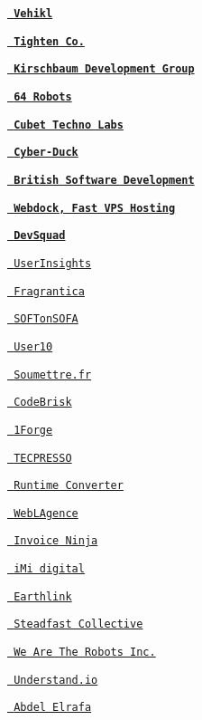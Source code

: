 \begin{DoxyItemize}
\item {\bfseries{\href{https://vehikl.com/}{\texttt{ Vehikl}}}}
\item {\bfseries{\href{https://tighten.co}{\texttt{ Tighten Co.}}}}
\item {\bfseries{\href{https://kirschbaumdevelopment.com}{\texttt{ Kirschbaum Development Group}}}}
\item {\bfseries{\href{https://64robots.com}{\texttt{ 64 Robots}}}}
\item {\bfseries{\href{https://cubettech.com}{\texttt{ Cubet Techno Labs}}}}
\item {\bfseries{\href{https://cyber-duck.co.uk}{\texttt{ Cyber-\/\+Duck}}}}
\item {\bfseries{\href{https://www.britishsoftware.co}{\texttt{ British Software Development}}}}
\item {\bfseries{\href{https://www.webdock.io/en}{\texttt{ Webdock, Fast V\+PS Hosting}}}}
\item {\bfseries{\href{https://devsquad.com}{\texttt{ Dev\+Squad}}}}
\item \href{https://userinsights.com}{\texttt{ User\+Insights}}
\item \href{https://www.fragrantica.com}{\texttt{ Fragrantica}}
\item \href{https://softonsofa.com/}{\texttt{ S\+O\+F\+Ton\+S\+O\+FA}}
\item \href{https://user10.com}{\texttt{ User10}}
\item \href{https://soumettre.fr/}{\texttt{ Soumettre.\+fr}}
\item \href{https://codebrisk.com}{\texttt{ Code\+Brisk}}
\item \href{https://1forge.com}{\texttt{ 1Forge}}
\item \href{https://tecpresso.co.jp/}{\texttt{ T\+E\+C\+P\+R\+E\+S\+SO}}
\item \href{http://runtimeconverter.com/}{\texttt{ Runtime Converter}}
\item \href{https://weblagence.com/}{\texttt{ WebL\textquotesingle{}Agence}}
\item \href{https://www.invoiceninja.com}{\texttt{ Invoice Ninja}}
\item \href{https://www.imi-digital.de/}{\texttt{ i\+Mi digital}}
\item \href{https://www.earthlink.ro/}{\texttt{ Earthlink}}
\item \href{https://steadfastcollective.com/}{\texttt{ Steadfast Collective}}
\item \href{https://watr.mx/}{\texttt{ We Are The Robots Inc.}}
\item \href{https://www.understand.io/}{\texttt{ Understand.\+io}}
\item \href{https://abdelelrafa.com}{\texttt{ Abdel Elrafa}}
\end{DoxyItemize}


